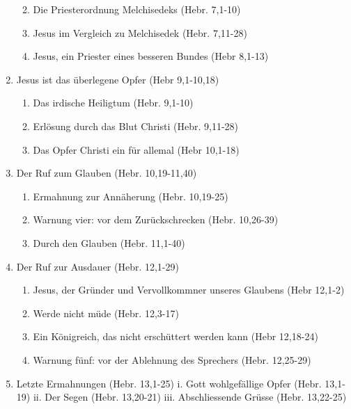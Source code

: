 \documentclass[
  12pt,
]{krantz}
\providecommand{\tightlist}{%
  \setlength{\itemsep}{0pt}\setlength{\parskip}{0pt}}
\begin{document}
\begin{enumerate}
  \begin{enumerate}
  \def\labelenumii{\roman{enumii}.}
  \tightlist
  \item
    Die Priesterordnung Melchisedeks (Hebr. 7,1-10)
  \item
    Jesus im Vergleich zu Melchisedek (Hebr. 7,11-28)
  \item
    Jesus, ein Priester eines besseren Bundes (Hebr 8,1-13)
  \end{enumerate}
\item
  Jesus ist das überlegene Opfer (Hebr 9,1-10,18)

  \begin{enumerate}
  \def\labelenumii{\roman{enumii}.}
  \tightlist
  \item
    Das irdische Heiligtum (Hebr. 9,1-10)
  \item
    Erlösung durch das Blut Christi (Hebr. 9,11-28)
  \item
    Das Opfer Christi ein für allemal (Hebr 10,1-18)
  \end{enumerate}
\item
  Der Ruf zum Glauben (Hebr. 10,19-11,40)

  \begin{enumerate}
  \def\labelenumii{\roman{enumii}.}
  \tightlist
  \item
    Ermahnung zur Annäherung (Hebr. 10,19-25)
  \item
    Warnung vier: vor dem Zurückschrecken (Hebr. 10,26-39)
  \item
    Durch den Glauben (Hebr. 11,1-40)
  \end{enumerate}
\item
  Der Ruf zur Ausdauer (Hebr. 12,1-29)

  \begin{enumerate}
  \def\labelenumii{\roman{enumii}.}
  \tightlist
  \item
    Jesus, der Gründer und Vervollkommner unseres Glaubens (Hebr 12,1-2)
  \item
    Werde nicht müde (Hebr. 12,3-17)
  \item
    Ein Königreich, das nicht erschüttert werden kann (Hebr 12,18-24)
  \item
    Warnung fünf: vor der Ablehnung des Sprechers (Hebr. 12,25-29)
  \end{enumerate}
\item
  Letzte Ermahnungen (Hebr. 13,1-25)
  i. Gott wohlgefällige Opfer (Hebr. 13,1-19)
  ii. Der Segen (Hebr. 13,20-21)
  iii. Abschliessende Grüsse (Hebr. 13,22-25)
\end{enumerate}
\end{document}
